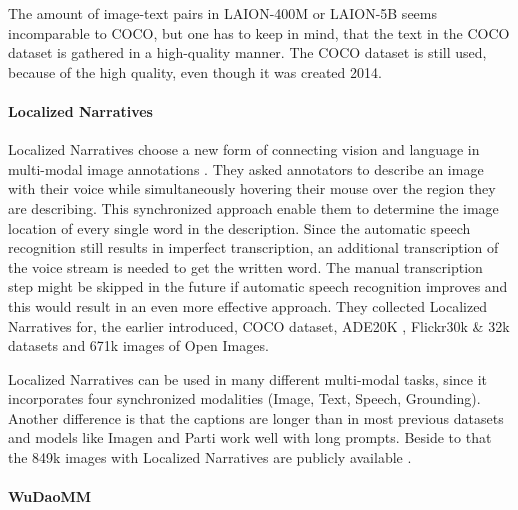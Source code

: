 \documentclass[
]{krantz}
\begin{document}
The amount of image-text pairs in LAION-400M or LAION-5B seems incomparable to COCO, but one has to keep in mind, that the text in the COCO dataset is gathered in a high-quality manner. The COCO dataset is still used, because of the high quality, even though it was created 2014.

\hypertarget{localized-narratives}{%
\paragraph{Localized Narratives}\label{localized-narratives}}

Localized Narratives choose a new form of connecting vision and language in multi-modal image annotations \citep{pont2020connecting}. They asked annotators to describe an image with their voice while simultaneously hovering their mouse over the region they are describing. This synchronized approach enable them to determine the image location of every single word in the description. Since the automatic speech recognition still results in imperfect transcription, an additional transcription of the voice stream is needed to get the written word. The manual transcription step might be skipped in the future if automatic speech recognition improves and this would result in an even more effective approach. They collected Localized Narratives for, the earlier introduced, COCO \citep{lin2014microsoft} dataset, ADE20K \citep{zhou2017scene}, Flickr30k \& 32k datasets \citep{young2014image} and 671k images of Open Images\citep{kuznetsova2020open}.

Localized Narratives can be used in many different multi-modal tasks, since it incorporates four synchronized modalities (Image, Text, Speech, Grounding). Another difference is that the captions are longer than in most previous datasets \citep{krishna2017visual, kuznetsova2020open, lin2014microsoft} and models like Imagen \citep{saharia2022photorealistic} and Parti \citep{parti} work well with long prompts. Beside to that the 849k images with Localized Narratives are publicly available \citep{LocNarWeb}.

\hypertarget{wudaomm}{%
\paragraph{WuDaoMM}\label{wudaomm}}
\end{document}
